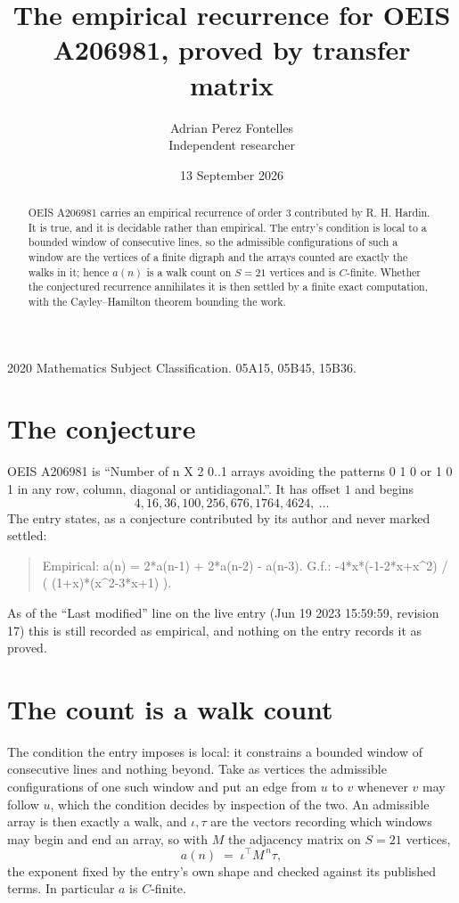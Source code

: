 \documentclass[11pt,a4paper]{article}
\title{The empirical recurrence for OEIS A206981, proved by transfer matrix}
\author{Adrian Perez Fontelles\\ \small Independent researcher}
\date{13 September 2026}
\theoremstyle{plain}
\theoremstyle{definition}
\begin{document}
\maketitle

\begin{abstract}
OEIS A206981 carries an empirical recurrence of order $3$ contributed by R. H. Hardin. It is
true, and it is decidable rather than empirical. The entry's condition is local to a bounded window of consecutive lines, so
the admissible configurations of such a window are the vertices of a finite digraph and the
arrays counted are exactly the walks in it; hence $a(n)$ is a walk count on $S=21$ vertices
and is $C$-finite. Whether the conjectured recurrence annihilates it is then settled by a
finite exact computation, with the Cayley--Hamilton theorem bounding the work.
\end{abstract}

\noindent\small 2020 Mathematics Subject Classification. 05A15, 05B45, 15B36.\normalsize

\section{The conjecture}

OEIS A206981 is ``Number of n X 2 0..1 arrays avoiding the patterns 0 1 0 or 1 0 1 in any row, column, diagonal or antidiagonal.''. It has offset $1$ and begins
\[
4, 16, 36, 100, 256, 676, 1764, 4624,\ \dots
\]
The entry states, as a conjecture contributed by its author and never marked settled:
\begin{quote}
Empirical: a(n) = 2*a(n-1) + 2*a(n-2) - a(n-3). G.f.: -4*x*(-1-2*x+x\^{}2) / ( (1+x)*(x\^{}2-3*x+1) ).
\end{quote}
As of the ``Last modified'' line on the live entry (Jun 19 2023 15:59:59, revision 17) this is still
recorded as empirical, and nothing on the entry records it as proved.

\section{The count is a walk count}

The condition the entry imposes is local: it constrains a bounded window of consecutive lines and nothing beyond. Take as vertices the admissible configurations of one such window and put an edge from $u$ to $v$ whenever $v$ may follow $u$, which the condition decides by inspection of the two.
An admissible array is then exactly a walk, and $\iota,\tau$ are the vectors recording which windows may begin and end an array, so with $M$ the adjacency matrix on $S=21$ vertices,
\[
a(n)\;=\;\iota^{\!\top}M^{\,n}\tau ,
\]
the exponent fixed by the entry's own shape and checked against its published terms. In
particular $a$ is $C$-finite.
\end{document}
